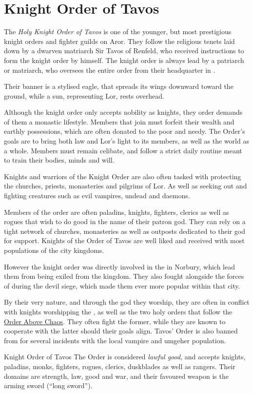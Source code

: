 \section{Knight Order of Tavos}
\label{sec:Knight Order of Tavos}

The \emph{Holy Knight Order of Tavos} is one of the younger, but most
prestigious knight orders and fighter guilds on Aror. They follow the
religious tenets laid down by a dwarven matriarch Sir Tavos of Renfeld, who
received instructions to form the knight order by  himself.
The knight order is always lead by a patriarch or matriarch, who oversees the
entire order from their headquarter in .

Their banner is a stylised eagle, that spreads its wings downward toward the
ground, while a sun, representing Lor, rests overhead.

Although the knight order only accepts nobility as knights, they order demands
of them a monastic lifestyle. Members that join must forfeit their wealth and
earthly possessions, which are often donated to the poor and needy. The
Order's goals are to bring both law and Lor's light to its members, as well as
the world as a whole. Members must remain celibate, and follow a strict daily
routine meant to train their bodies, minds and will.

Knights and warriors of the Knight Order are also often tasked with protecting
the churches, priests, monasteries and pilgrims of Lor. As well as seeking out
and fighting creatures such as evil vampires, undead and daemons.

Members of the order are often paladins, knights, fighters, clerics as well as
rogues that wish to do good in the name of their patron god.  They can rely on
a tight network of churches, monasteries as well as outposts dedicated to
their god for support. Knights of the Order of Tavos are well liked and
received with most populations of the city kingdoms.

However the knight order was directly involved in the  in Norbury, which lead them from being exiled from the
kingdom. They also fought alongside the forces of  during
the devil siege, which made them ever more popular within that city.

By their very nature, and through the god they worship, they are often in
conflict with knights worshipping the , as well as
the two holy orders that follow the \hyperref[sec:Order]{Order Above Chaos}.
They often fight the former, while they are known to cooperate with the latter
should their goals align. Tavos' Order is also banned from
 for several incidents with the local vampire and
umgeher population.

\begin{35e}{Knight Order of Tavos}
  The Order is considered \emph{lawful good}, and accepts knights, paladins,
  monks, fighters, rogues, clerics, duskblades as well as rangers. Their domains
  are strength, law, good and war, and their favoured weapon is the arming
  sword (``long sword'').
\end{35e}
